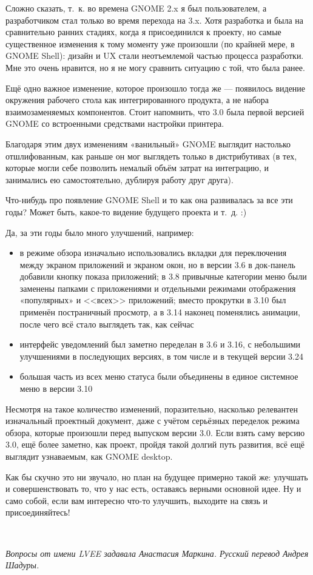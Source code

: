 \documentclass[10pt, a5paper]{article}
\begin{document}
\begin{Parallel}[p]{}{}
{\a Сложно сказать, т.~к. во времена GNOME 2.x я был пользователем, а разработчиком стал только во время перехода на 3.x. Хотя разработка и была на сравнительно ранних стадиях, когда я присоединился к проекту, но самые существенное изменения к тому моменту уже произошли (по крайней мере, в GNOME Shell): дизайн и UX стали неотъемлемой частью процесса разработки. Мне это очень нравится, но я не могу сравнить ситуацию с той, что была ранее.

Ещё одно важное изменение, которое произошло тогда же — появилось видение окружения рабочего стола как интегрированного продукта, а не набора взаимозаменяемых компонентов. Стоит напомнить, что 3.0 была первой версией GNOME со встроенными средствами настройки принтера.

Благодаря этим двух изменениям «ванильный» GNOME выглядит настолько отшлифованным, как раньше он мог выглядеть только в дистрибутивах (в тех, которые могли себе позволить немалый объём затрат на интеграцию, и занимались ею самостоятельно, дублируя работу друг друга).

\q Что-нибудь про появление GNOME Shell и то как она развивалась за все эти годы? Может быть, какое-то видение будущего проекта и т.~д. :)

\a Да, за эти годы было много улучшений, например:
\begin{itemize}
\item в режиме обзора изначально использовались вкладки для переключения между экраном приложений и экраном окон, но в версии 3.6 в док-панель добавили кнопку показа приложений; в 3.8 привычные категории меню были заменены папками с приложениями и отдельными режимами отображения «популярных» и <<всех>> приложений; вместо прокрутки в 3.10 был применён постраничный просмотр, а в 3.14 наконец поменялись анимации, после чего всё стало выглядеть так, как сейчас

\item интерфейс уведомлений был заметно переделан в 3.6 и 3.16, с небольшими улучшениями в последующих версиях, в том числе и в текущей версии 3.24

\item большая часть из всех меню статуса были объединены в единое системное меню в версии 3.10
\end{itemize}

Несмотря на такое количество изменений, поразительно, насколько релевантен изначальный проектный документ\fakefootnote{}, даже с учётом серьёзных переделок режима обзора, которые произошли перед выпуском версии 3.0. Если взять саму версию 3.0\fakefootnote{}, ещё более заметно, как проект, пройдя такой долгий путь развития, всё ещё выглядит узнаваемым, как GNOME desktop.

Как бы скучно это ни звучало, но план на будущее примерно такой же: улучшать и совершенствовать то, что у нас есть, оставаясь верными основной идее. Ну и само собой, если вам интересно что-то улучшить, выходите на связь и присоединяйтесь!

~

\noindent \emph{Вопросы от имени LVEE задавала Анастасия Маркина. Русский перевод Андрея Шадуры.}

\vfill
     }
   \end{Parallel}
\end{document}
